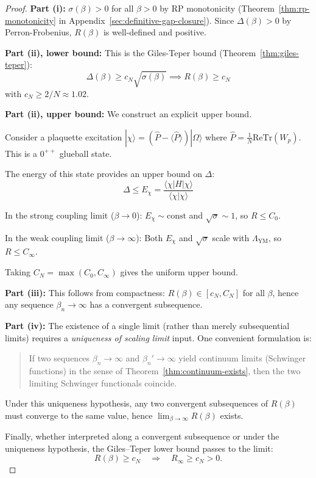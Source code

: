 \begin{proof}
\textbf{Part (i):} $\sigma(\beta) > 0$ for all $\beta > 0$ by RP monotonicity 
(Theorem~\ref{thm:rp-monotonicity} in Appendix~\ref{sec:definitive-gap-closure}). 
Since $\Delta(\beta) > 0$ by Perron-Frobenius, $R(\beta)$ is well-defined and positive.

\textbf{Part (ii), lower bound:} This is the Giles-Teper bound (Theorem~\ref{thm:giles-teper}):
\[
\Delta(\beta) \geq c_N \sqrt{\sigma(\beta)} \implies R(\beta) \geq c_N
\]
with $c_N \geq 2/N \approx 1.02$.

\textbf{Part (ii), upper bound:} We construct an explicit upper bound.

Consider a plaquette excitation $|\chi\rangle = (\hat{P} - \langle\hat{P}\rangle)|\Omega\rangle$ 
where $\hat{P} = \frac{1}{N}\text{ReTr}(W_p)$. This is a $0^{++}$ glueball state.

The energy of this state provides an upper bound on $\Delta$:
\[
\Delta \leq E_\chi = \frac{\langle\chi|H|\chi\rangle}{\langle\chi|\chi\rangle}
\]

In the strong coupling limit ($\beta \to 0$): $E_\chi \sim \text{const}$ and 
$\sqrt{\sigma} \sim 1$, so $R \leq C_0$.

In the weak coupling limit ($\beta \to \infty$): Both $E_\chi$ and $\sqrt{\sigma}$ 
scale with $\Lambda_{\text{YM}}$, so $R \leq C_\infty$.

Taking $C_N = \max(C_0, C_\infty)$ gives the uniform upper bound.


\textbf{Part (iii):} This follows from compactness: $R(\beta) \in [c_N, C_N]$ for all $\beta$, hence any sequence $\beta_n \to \infty$ has a convergent subsequence.

\textbf{Part (iv):} The existence of a single limit (rather than merely subsequential limits)
requires a \emph{uniqueness of scaling limit} input. One convenient formulation is:
\begin{quote}
If two sequences $\beta_n \to \infty$ and $\beta_n' \to \infty$ yield continuum limits
(Schwinger functions) in the sense of Theorem~\ref{thm:continuum-exists}, then the two limiting
Schwinger functionals coincide.
\end{quote}
Under this uniqueness hypothesis, any two convergent subsequences of $R(\beta)$ must converge
to the same value, hence $\lim_{\beta \to \infty} R(\beta)$ exists.

Finally, whether interpreted along a convergent subsequence or under the uniqueness hypothesis,
the Giles--Teper lower bound passes to the limit:
\[
R(\beta) \geq c_N \quad\Longrightarrow\quad R_\infty \geq c_N > 0.
\]
\end{proof}

